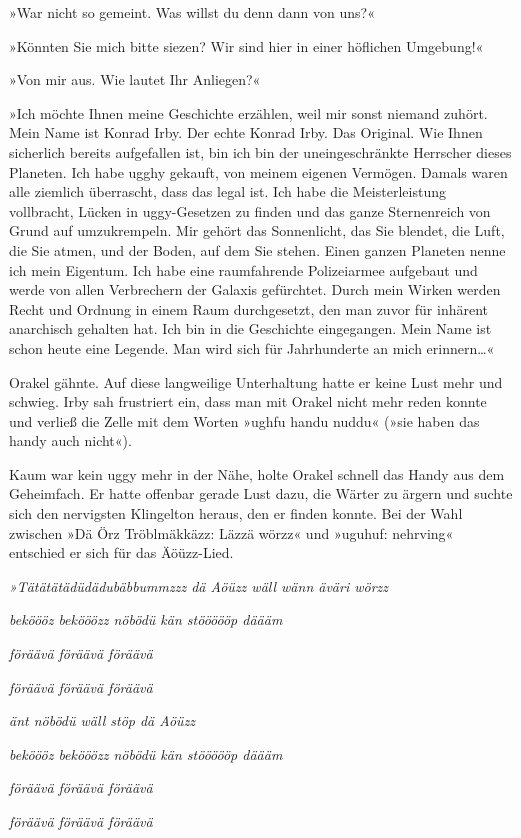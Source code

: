 »War nicht so gemeint. Was willst du denn dann von uns?«

»Könnten Sie mich bitte siezen? Wir sind hier in einer höflichen Umgebung!«

»Von mir aus. Wie lautet Ihr Anliegen?«

»Ich möchte Ihnen meine Geschichte erzählen, weil mir sonst niemand zuhört. Mein Name ist Konrad Irby. Der echte Konrad Irby. Das Original. Wie Ihnen sicherlich bereits aufgefallen ist, bin ich bin der uneingeschränkte Herrscher dieses Planeten. Ich habe ugghy gekauft, von meinem eigenen Vermögen. Damals waren alle ziemlich überrascht, dass das legal ist. Ich habe die Meisterleistung vollbracht, Lücken in uggy-Gesetzen zu finden und das ganze Sternenreich von Grund auf umzukrempeln. Mir gehört das Sonnenlicht, das Sie blendet, die Luft, die Sie atmen, und der Boden, auf dem Sie stehen. Einen ganzen Planeten nenne ich mein Eigentum. Ich habe eine raumfahrende Polizeiarmee aufgebaut und werde von allen Verbrechern der Galaxis gefürchtet. Durch mein Wirken werden Recht und Ordnung in einem Raum durchgesetzt, den man zuvor für inhärent anarchisch gehalten hat. Ich bin in die Geschichte eingegangen. Mein Name ist schon heute eine Legende. Man wird sich für Jahrhunderte an mich erinnern…«

Orakel gähnte. Auf diese langweilige Unterhaltung hatte er keine Lust mehr und schwieg. Irby sah frustriert ein, dass man mit Orakel nicht mehr reden konnte und verließ die Zelle mit dem Worten »ughfu handu nuddu« (»sie haben das handy auch nicht«).

Kaum war kein uggy mehr in der Nähe, holte Orakel schnell das Handy aus dem Geheimfach. Er hatte offenbar gerade Lust dazu, die Wärter zu ärgern und suchte sich den nervigsten Klingelton heraus, den er finden konnte. Bei der Wahl zwischen »Dä Örz Tröblmäkkäzz: Läzzä wörzz« und »uguhuf: nehrving« entschied er sich für das Äöüzz-Lied.

\textit{»Tätätätädüdädubäbbummzzz dä Aöüzz wäll wänn äväri wörzz}

\textit{beköööz bekööözz nöbödü kän stöööööp däääm}

\textit{föräävä föräävä föräävä}

\textit{föräävä föräävä föräävä}

\textit{änt nöbödü wäll stöp dä Aöüzz}

\textit{beköööz bekööözz nöbödü kän stöööööp däääm}

\textit{föräävä föräävä föräävä}

\textit{föräävä föräävä föräävä}

